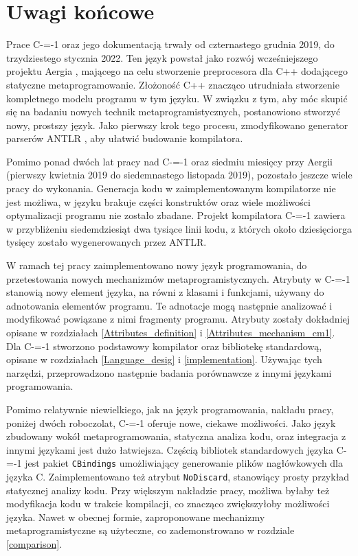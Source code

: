 \section{Uwagi końcowe}

Prace C-=-1 oraz jego dokumentacją trwały od czternastego grudnia 2019, do trzydziestego stycznia 2022.
Ten język powstał jako rozwój wcześniejszego projektu Aergia \cite{grabski:aergia}, mającego na celu stworzenie preprocesora dla C++ dodającego statyczne metaprogramowanie.
Złożoność C++ znacząco utrudniała stworzenie kompletnego modelu programu w tym języku.
W związku z tym, aby móc skupić się na badaniu nowych technik metaprogramistycznych, postanowiono stworzyć nowy, prostszy język.
Jako pierwszy krok tego procesu, zmodyfikowano generator parserów ANTLR \cite{grabski2020}, aby ułatwić budowanie kompilatora.

Pomimo ponad dwóch lat pracy nad C-=-1 oraz siedmiu miesięcy przy Aergii (pierwszy kwietnia 2019 do siedemnastego listopada 2019), pozostało jeszcze wiele pracy do wykonania.
Generacja kodu w zaimplementowanym kompilatorze nie jest możliwa, w języku brakuje części konstruktów oraz wiele możliwości optymalizacji programu nie zostało zbadane.
Projekt kompilatora C-=-1 zawiera w przybliżeniu siedemdziesiąt dwa tysiące linii kodu, z których około dziesięciorga tysięcy zostało wygenerowanych przez ANTLR.

W ramach tej pracy zaimplementowano nowy język programowania, do przetestowania nowych mechanizmów metaprogramistycznych.
Atrybuty w C-=-1 stanowią nowy element języka, na równi z klasami i funkcjami, używany do adnotowania elementów programu.
Te adnotacje mogą następnie analizować i modyfikować powiązane z nimi fragmenty programu.
Atrybuty zostały dokładniej opisane w rozdziałach \ref{Attributes_definition} i \ref{Attributes_mechanism_cm1}.
Dla C-=-1 stworzono podstawowy kompilator oraz bibliotekę standardową, opisane w rozdziałach \ref{Language_desig} i \ref{implementation}.
Używając tych narzędzi, przeprowadzono następnie badania porównawcze z innymi językami programowania.

Pomimo relatywnie niewielkiego, jak na język programowania, nakładu pracy, poniżej dwóch roboczolat, C-=-1 oferuje nowe, ciekawe możliwości.
Jako język zbudowany wokół metaprogramowania, statyczna analiza kodu, oraz integracja z innymi językami jest dużo łatwiejsza.
Częścią bibliotek standardowych języka C-=-1 jest pakiet \lstinline{CBindings} umożliwiający generowanie plików nagłówkowych dla języka C.
Zaimplementowano też atrybut \lstinline{NoDiscard}, stanowiący prosty przykład statycznej analizy kodu.
Przy większym nakładzie pracy, możliwa byłaby też modyfikacja kodu w trakcie kompilacji, co znacząco zwiększyłoby możliwości języka.
Nawet w obecnej formie, zaproponowane mechanizmy metaprogramistyczne są użyteczne, co zademonstrowano w rozdziale \ref{comparison}.

